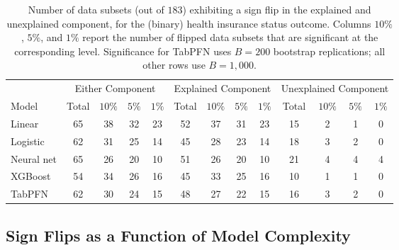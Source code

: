 \begin{table}[!ht]
    \caption{Number of data subsets (out of $183$) exhibiting a sign flip in the explained and unexplained component, for the (binary) health insurance status outcome. Columns $10\%$, $5\%$, and $1\%$ report the number of flipped data subsets that are significant at the corresponding level. Significance for TabPFN uses $B = 200$ bootstrap replications; all other rows use $B = 1{,}000$.} %
    \label{tab:flips_census_insurance}
    \centering
    \small
    \begin{tabular}{l*{12}{c}}
    \toprule
          & \multicolumn{4}{c}{Either Component} & \multicolumn{4}{c}{Explained Component} & \multicolumn{4}{c}{Unexplained Component} \\
          \cmidrule(lr){2-5} \cmidrule(lr){6-9} \cmidrule(lr){10-13}
    Model       & Total & $10\%$ & $5\%$ & $1\%$ & Total & $10\%$ & $5\%$ & $1\%$ & Total & $10\%$ & $5\%$ & $1\%$ \\
    \midrule
    Linear      & 65 & 38 & 32 & 23 & 52 & 37 & 31 & 23 & 15 & 2 & 1 & 0 \\
    Logistic    & 62 & 31 & 25 & 14 & 45 & 28 & 23 & 14 & 18 & 3 & 2 & 0 \\
    Neural net & 65 & 26 & 20 & 10 & 51 & 26 & 20 & 10 & 21 & 4 & 4 & 4 \\
    XGBoost    & 54 & 34 & 26 & 16 & 45 & 33 & 25 & 16 & 10 & 1 & 1 & 0 \\
    TabPFN     & 62 & 30 & 24 & 15 & 48 & 27 & 22 & 15 & 16 & 3 & 2 & 0 \\
    \bottomrule
    \end{tabular}
\end{table}


\subsection{Sign Flips as a Function of Model Complexity}
\label{appendix:complexity}


